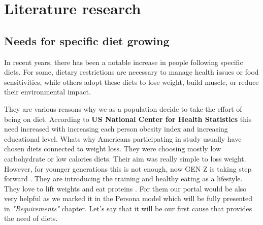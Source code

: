 \section {Literature research}
\subsection{Needs for specific diet growing}
In recent years, there has been a notable increase in people following specific diets\cite{martin2020prescription}.  For some, dietary restrictions are necessary to manage health issues or food sensitivities, while others adopt these diets to lose weight, build muscle, or reduce their environmental impact.
\par
They are various reasons why we as a population decide to take the effort of being on diet. According to \textbf{US National Center for Health Statistics}\cite{martin2020prescription} this need increased with increasing each person obesity index and increasing educational level. Whats why Americans participating in study  usually have chosen diets connected to weight loss. They were choosing mostly low carbohydrate or low calories diets. Their aim was really simple to loss weight. However, for younger generations this is not enough, now GEN Z is taking step forward \cite{haddon2024genz}. They are introducing the training and healthy eating as a lifestyle. They love to lift weights and eat proteins \cite{fortune2024gym}. For them our portal would be also very helpful as  we marked it in the Persona model which will be fully presented in \textit{"Requirements"} chapter. Let's say that it will be our first cause that provides the need of diets.
\par
